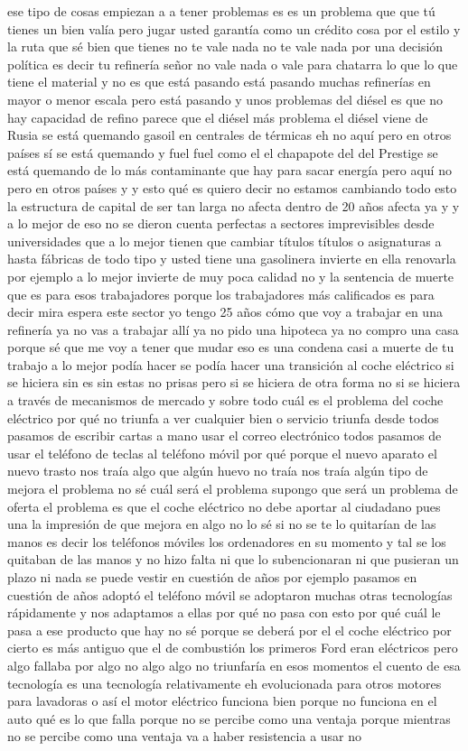 ese tipo de cosas empiezan a a tener problemas es es un problema que que tú tienes un bien valía pero jugar usted garantía como un crédito cosa por el estilo y la ruta que sé bien que tienes no te vale nada no te vale nada por una decisión política es decir tu refinería señor no vale nada o vale para chatarra lo que lo que tiene el material y no es que está pasando está pasando muchas refinerías en mayor o menor escala pero está pasando y unos problemas del diésel es que no hay capacidad de refino parece que el diésel más problema el diésel viene de Rusia se está quemando gasoil en centrales de térmicas eh no aquí pero en otros países sí se está quemando y fuel fuel como el el chapapote del del Prestige se está quemando de lo más contaminante que hay para sacar energía pero aquí no pero en otros países y y esto qué es quiero decir no estamos cambiando todo esto la estructura de capital de ser tan larga no afecta dentro de 20 años afecta ya y y a lo mejor de eso no se dieron cuenta perfectas a sectores imprevisibles desde universidades que a lo mejor tienen que cambiar títulos títulos o asignaturas a hasta fábricas de todo tipo y usted tiene una gasolinera invierte en ella renovarla por ejemplo a lo mejor invierte de muy poca calidad no y la sentencia de muerte que es para esos trabajadores porque los trabajadores más calificados es para decir mira espera este sector yo tengo 25 años cómo que voy a trabajar en una refinería ya no vas a trabajar allí ya no pido una hipoteca ya no compro una casa porque sé que me voy a tener que mudar eso es una condena casi a muerte de tu trabajo a lo mejor podía hacer se podía hacer una transición al coche eléctrico si se hiciera sin es sin estas no prisas pero si se hiciera de otra forma no si se hiciera a través de mecanismos de mercado y sobre todo cuál es el problema del coche eléctrico por qué no triunfa a ver cualquier bien o servicio triunfa desde todos pasamos de escribir cartas a mano usar el correo electrónico todos pasamos de usar el teléfono de teclas al teléfono móvil por qué porque el nuevo aparato el nuevo trasto nos traía algo que algún huevo no traía nos traía algún tipo de mejora el problema no sé cuál será el problema supongo que será un problema de oferta el problema es que el coche eléctrico no debe aportar al ciudadano pues una la impresión de que mejora en algo no lo sé si no se te lo quitarían de las manos es decir los teléfonos móviles los ordenadores en su momento y tal se los quitaban de las manos y no hizo falta ni que lo subencionaran ni que pusieran un plazo ni nada se puede vestir en cuestión de años por ejemplo pasamos en cuestión de años adoptó el teléfono móvil se adoptaron muchas otras tecnologías rápidamente y nos adaptamos a ellas por qué no pasa con esto por qué cuál le pasa a ese producto que hay no sé porque se deberá por el el coche eléctrico por cierto es más antiguo que el de combustión los primeros Ford eran eléctricos pero algo fallaba por algo no algo algo no triunfaría en esos momentos el cuento de esa tecnología es una tecnología relativamente eh evolucionada para otros motores para lavadoras o así el motor eléctrico funciona bien porque no funciona en el auto qué es lo que falla porque no se percibe como una ventaja porque mientras no se percibe como una ventaja va a haber resistencia a usar no 